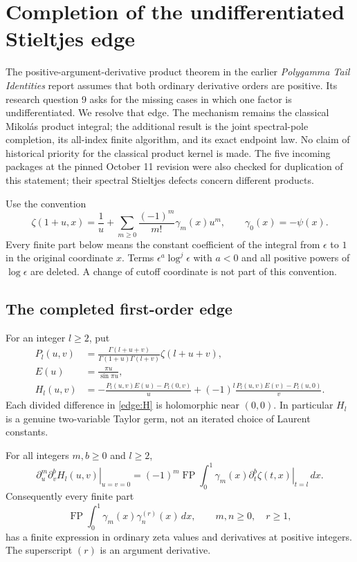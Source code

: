 \section{Completion of the undifferentiated Stieltjes edge}
\label{edge:sec}

The positive-argument-derivative product theorem in the earlier
\emph{Polygamma Tail Identities} report \cite{tail-polygamma} assumes that both ordinary
derivative orders are positive.  Its research question 9 asks for the
missing cases in which one factor is undifferentiated.  We resolve
that edge.  The mechanism remains the classical Mikol\'as product
integral; the additional result is the joint spectral-pole completion,
its all-index finite algorithm, and its exact endpoint law.  No claim
of historical priority for the classical product kernel is made.
The five incoming packages at the pinned October 11 revision were
also checked for duplication of this statement; their spectral
Stieltjes defects concern different products.

Use the convention
\[
 \zeta(1+u,x)=\frac1u+
       \sum_{m\ge0}\frac{(-1)^m}{m!}\gamma_m(x)u^m,
 \qquad \gamma_0(x)=-\psi(x).
\]
Every finite part below means the constant coefficient of the integral
from $\epsilon$ to $1$ in the original coordinate $x$.  Terms
$\epsilon^a\log^j\epsilon$ with $a<0$ and all positive powers of
$\log\epsilon$ are deleted.  A change of cutoff coordinate is not
part of this convention.

\subsection{The completed first-order edge}

For an integer $l\ge2$, put
\begin{align}
 P_l(u,v)&=\frac{\Gamma(l+u+v)}{\Gamma(1+u)\Gamma(l+v)}
                              \zeta(l+u+v),\\
 E(u)&=\frac{\pi u}{\sin\pi u},\\
 H_l(u,v)&=-\frac{P_l(u,v)E(u)-P_l(0,v)}u
       +(-1)^l\frac{P_l(u,v)E(v)-P_l(u,0)}v.
 \label{edge:H}
\end{align}
Each divided difference in \eqref{edge:H} is holomorphic near
$(0,0)$.  In particular $H_l$ is a genuine two-variable Taylor germ,
not an iterated choice of Laurent constants.

\begin{theorem}
\label{edge:theorem}
For all integers $m,b\ge0$ and $l\ge2$,
\begin{equation}
 \left.\partial_u^m\partial_v^b H_l(u,v)\right|_{u=v=0}
 =(-1)^m\operatorname{FP}\int_0^1
    \gamma_m(x)\left.\partial_t^b\zeta(t,x)\right|_{t=l}\,dx.
 \label{edge:alljets}
\end{equation}
Consequently every finite part
\[
 \operatorname{FP}\int_0^1\gamma_m(x)\gamma_n^{(r)}(x)\,dx,
 \qquad m,n\ge0,\quad r\ge1,
\]
has a finite expression in ordinary zeta values and derivatives at
positive integers.  The superscript $(r)$ is an argument derivative.
\end{theorem}

